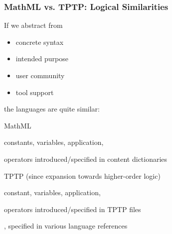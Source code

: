 \documentclass{beamer}
\begin{document}
\begin{frame}\frametitle{MathML vs. TPTP: Logical Similarities}
If we abstract from
\begin{itemize}
  \item concrete syntax
  \item intended purpose
  \item user community
  \item tool support
\end{itemize}
the languages are quite similar:

\begin{blockitems}{MathML}
 \item constants, variables, application, 
 \item {} operators introduced/specified in content dictionaries
\end{blockitems}
\begin{blockitems}{TPTP (since expansion towards higher-order logic)}
 \item constant, variables, application, 
 \item {} operators introduced/specified in TPTP files
 \item {}, specified in various language references
\end{blockitems}
\end{frame}
\end{document}
